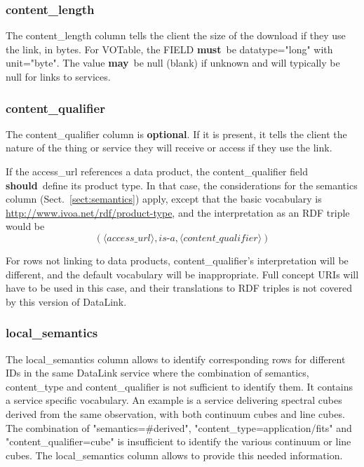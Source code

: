 \documentclass[11pt,a4paper]{ivoa}
\newcommand{\attval}[2]{#1={\allowbreak}{"}#2{"}}
\newcommand{\rfcmust}{\textbf{must}}
\newcommand{\rfcshould}{\textbf{should}}
\newcommand{\rfcmay}{\textbf{may}}
\newcommand{\rfcoptional}{\textbf{optional}}
\begin{document}
\subsubsection{content\_length}

The content\_length column tells the client the size of the download
if they use the link, in bytes. For VOTable, the FIELD \rfcmust\ be
\attval{datatype}{long} with \attval{unit}{byte}.
The value \rfcmay\ be null (blank)
if unknown and will typically be null for links to services.

\subsubsection{content\_qualifier}

The content\_qualifier column is \rfcoptional. If it is present, it tells 
the client the nature of the thing or service they will receive or access 
if they use the link. 

If the access\_url references a data product, the content\_qualifier
field \rfcshould\ define its product type.  In that case, the considerations
for the semantics column (Sect.~\ref{sect:semantics}) apply, except that
the basic vocabulary is \url{http://www.ivoa.net/rdf/product-type}, and
the interpretation as an RDF triple would be $$(
\langle\textit{access\_url}\rangle, \textit{is-a},
\langle\textit{content\_qualifier}\rangle)$$

For rows not linking to data products, content\_qualifier's
interpretation will be different, and the default vocabulary will be
inappropriate.  Full concept URIs will have to be used in this case, and
their translations to RDF triples is not covered by this version of
DataLink.

\subsubsection{local\_semantics}

The local\_semantics column allows to identify corresponding rows for 
different IDs in the same DataLink service where the combination of semantics, 
content\_type and content\_qualifier is not sufficient to identify them. 
It contains a service specific vocabulary. An example is a service delivering 
spectral cubes derived from the same observation, with both continuum cubes 
and line cubes. The combination of "semantics=\#derived", 
"content\_type=application/fits" and "content\_qualifier=cube" 
is insufficient to identify the various continuum or line cubes. 
The local\_semantics column allows to provide this needed information.   
\end{document}

